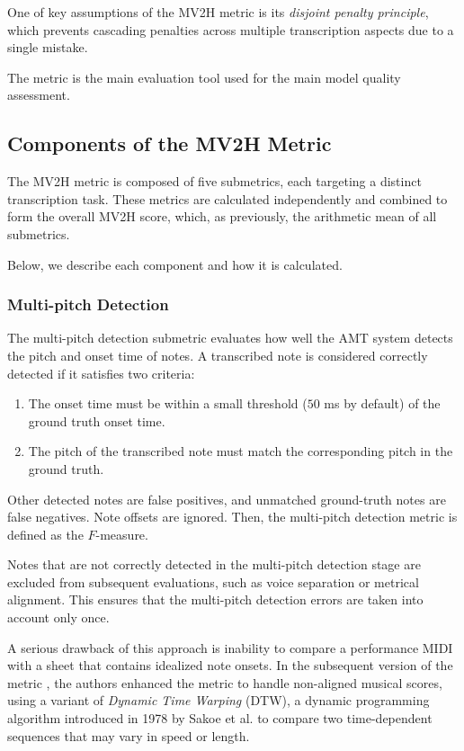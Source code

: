 One of key assumptions of the MV2H metric is its \emph{disjoint penalty principle}, which prevents cascading penalties across multiple transcription aspects due to a single mistake.

The metric is the main evaluation tool used for the main model quality assessment.

\subsection{Components of the MV2H Metric}

The MV2H metric is composed of five submetrics, each targeting a distinct transcription task. These metrics are calculated independently and combined to form the overall MV2H score, which, as previously, the arithmetic mean of all submetrics.

Below, we describe each component and how it is calculated.

\subsubsection{Multi-pitch Detection}

The multi-pitch detection submetric evaluates how well the AMT system detects the pitch and onset time of notes. A transcribed note is considered correctly detected if it satisfies two criteria: \begin{enumerate}
	\item The onset time must be within a small threshold ($50$ ms by default) of the ground truth onset time.
	\item The pitch of the transcribed note must match the corresponding pitch in the ground truth.\end{enumerate} Other detected notes are false positives, and unmatched ground-truth notes are false negatives. Note offsets are ignored. Then, the multi-pitch detection metric is defined as the $F$-measure.

Notes that are not correctly detected in the multi-pitch detection stage are excluded from subsequent evaluations, such as voice separation or metrical alignment. This ensures that the multi-pitch detection errors are taken into account only once.

A serious drawback of this approach is inability to compare a performance MIDI with a sheet that contains idealized note onsets. In the subsequent version of the metric \cite{McLeod2019}, the authors enhanced the metric to handle non-aligned musical scores, using a variant of \emph{Dynamic Time Warping} (DTW), a dynamic programming algorithm introduced in 1978 by Sakoe et al. \cite{Sakoe1978} to compare two time-dependent sequences that may vary in speed or length. 

